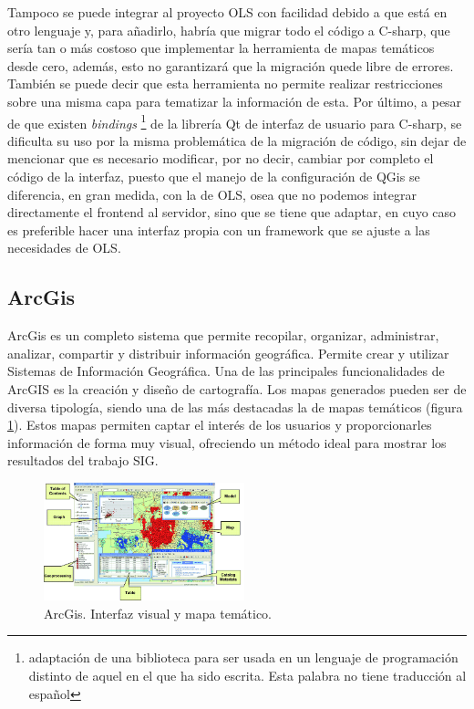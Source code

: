 Tampoco se puede integrar al proyecto OLS con facilidad debido a que est\'a en otro lenguaje y, para a\~nadirlo, habr\'ia que migrar todo el c\'odigo a C-sharp, que ser\'ia tan o m\'as costoso que implementar la herramienta de mapas tem\'aticos desde cero, adem\'as, esto no garantizar\'a que la migraci\'on quede libre de errores. Tambi\'en se puede decir que esta herramienta no permite realizar restricciones sobre una misma capa para tematizar la informaci\'on de esta. Por \'ultimo, a pesar de que existen \emph{bindings} \footnote{adaptaci\'on de una biblioteca para ser usada en un lenguaje de programaci\'on distinto de aquel en el que ha sido escrita. Esta palabra no tiene traducci\'on al espa\~nol} de la librer\'ia Qt de interfaz de usuario para C-sharp, se dificulta su uso por la misma problem\'atica de la migraci\'on de c\'odigo, sin dejar de mencionar que es necesario modificar, por no decir, cambiar por completo el c\'odigo de la interfaz, puesto que el manejo de la configuraci\'on de QGis se diferencia, en gran medida, con la de OLS, osea que no podemos integrar directamente el frontend al servidor, sino que se tiene que adaptar, en cuyo caso es preferible hacer una interfaz propia con un framework que se ajuste a las necesidades de OLS.


\subsection{ArcGis}
ArcGis es un completo sistema que permite recopilar, organizar, administrar, analizar, compartir y distribuir informaci\'on geogr\'afica. Permite crear y utilizar Sistemas de Informaci\'on Geogr\'afica. Una de las principales funcionalidades de ArcGIS es la creaci\'on y dise\~no de cartograf\'ia. Los mapas generados pueden ser de diversa tipolog\'ia, siendo una de las m\'as destacadas la de mapas tem\'aticos (figura \ref{arcGis}). Estos mapas permiten captar el inter\'es de los usuarios y proporcionarles informaci\'on de forma muy visual, ofreciendo un m\'etodo ideal para mostrar los resultados del trabajo SIG.

\begin{figure}
\vspace{-20pt}
\begin{center}
\includegraphics[width=0.52\textwidth]{images/arcGis.png} 
\end{center} \vspace{-20pt} \caption{ArcGis. Interfaz visual y mapa tem\'atico.}  \label{arcGis} \vspace{-10pt} 
\end{figure}

